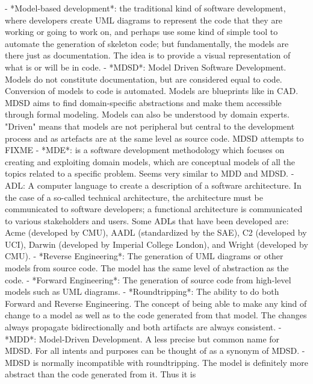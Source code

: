 \documentclass{book}
\begin{document}
- *Model-based development*: the traditional kind of software
  development, where developers create UML diagrams to represent the
  code that they are working or going to work on, and perhaps use some
  kind of simple tool to automate the generation of skeleton code; but
  fundamentally, the models are there just as documentation. The idea
  is to provide a visual representation of what is or will be in code.
- *MDSD*: Model Driven Software Development. Models do not constitute
  documentation, but are considered equal to code. Conversion of
  models to code is automated. Models are blueprints like in CAD.
  MDSD aims to find domain-specific abstractions and make them
  accessible through formal modeling. Models can also be understood by
  domain experts. "Driven" means that models are not peripheral but
  central to the development process and as artefacts are at the same
  level as source code. MDSD attempts to FIXME
  - *MDE*:
  is a software development
  methodology which focuses on creating and exploiting domain models,
  which are conceptual models of all the topics related to a specific
  problem. Seems very similar to MDD and MDSD.
  - ADL:
  A computer language to
  create a description of a software architecture. In the case of a
  so-called technical architecture, the architecture must be
  communicated to software developers; a functional architecture is
  communicated to various stakeholders and users. Some ADLs that have
  been developed are: Acme (developed by CMU), AADL (standardized by
  the SAE), C2 (developed by UCI), Darwin (developed by Imperial
  College London), and Wright (developed by CMU).
- *Reverse Engineering*: The generation of UML diagrams or other
  models from source code. The model has the same level of abstraction
  as the code.
- *Forward Engineering*: The generation of source code from high-level
  models such as UML diagrams.
- *Roundtripping*: The ability to do both Forward and Reverse
  Engineering. The concept of being able to make any kind of change to
  a model as well as to the code generated from that model. The
  changes always propagate bidirectionally and both artifacts are
  always consistent.
- *MDD*: Model-Driven Development. A less precise but common name for
  MDSD. For all intents and purposes can be thought of as a synonym of
  MDSD.
- MDSD is normally incompatible with roundtripping. The model is
  definitely more abstract than the code generated from it. Thus it is
\end{document}
